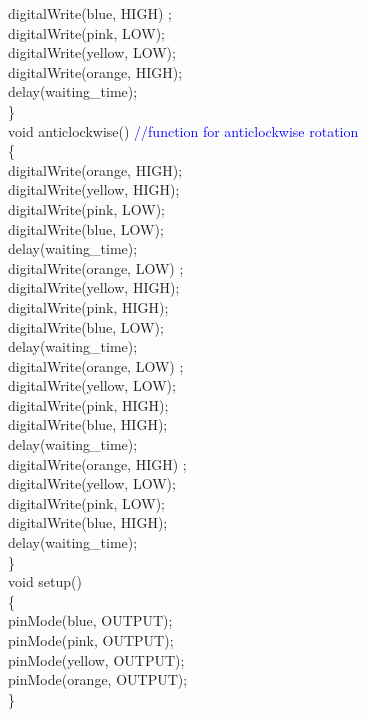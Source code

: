 \documentclass[12pt,a4paper]{article}
\begin{document}
  digitalWrite(blue, HIGH) ;\\
  digitalWrite(pink, LOW);\\
  digitalWrite(yellow, LOW);\\
  digitalWrite(orange, HIGH);\\
  delay(waiting\_time);\\
  
 \}\\

void anticlockwise() \hspace{12pt}\textcolor{blue}{//function for anticlockwise rotation\\}
\{   \\        
  digitalWrite(orange, HIGH);\\
  digitalWrite(yellow, HIGH);\\
  digitalWrite(pink, LOW);\\
  digitalWrite(blue, LOW);\\
  delay(waiting\_time);\\[3pt]

  digitalWrite(orange, LOW) ;\\
  digitalWrite(yellow, HIGH);\\
  digitalWrite(pink, HIGH);\\
  digitalWrite(blue, LOW);\\
  delay(waiting\_time);\\[3pt]

  digitalWrite(orange, LOW) ;\\
  digitalWrite(yellow, LOW);\\
  digitalWrite(pink, HIGH);\\
  digitalWrite(blue, HIGH);\\
  delay(waiting\_time);\\[3pt]

  digitalWrite(orange, HIGH) ;\\
  digitalWrite(yellow, LOW);\\
  digitalWrite(pink, LOW);\\
  digitalWrite(blue, HIGH);\\
  delay(waiting\_time);\\[3pt]
  
 \}\\[3pt]

  void setup() \\
  \{\\
  pinMode(blue, OUTPUT);\\
  pinMode(pink, OUTPUT);\\
  pinMode(yellow, OUTPUT);\\
  pinMode(orange, OUTPUT);\\
\}\\[3pt]
\end{document}
